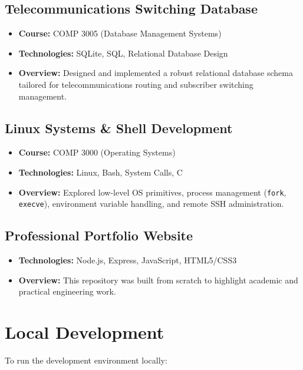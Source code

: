 \documentclass{article}
\begin{document}
\subsection{Telecommunications Switching Database}
\begin{itemize}
    \item \textbf{Course:} COMP 3005 (Database Management Systems)
    \item \textbf{Technologies:} SQLite, SQL, Relational Database Design
    \item \textbf{Overview:} Designed and implemented a robust relational database schema tailored for telecommunications routing and subscriber switching management.
\end{itemize}

\subsection{Linux Systems \& Shell Development}
\begin{itemize}
    \item \textbf{Course:} COMP 3000 (Operating Systems)
    \item \textbf{Technologies:} Linux, Bash, System Calls, C
    \item \textbf{Overview:} Explored low-level OS primitives, process management (\texttt{fork}, \texttt{execve}), environment variable handling, and remote SSH administration.
\end{itemize}

\subsection{Professional Portfolio Website}
\begin{itemize}
    \item \textbf{Technologies:} Node.js, Express, JavaScript, HTML5/CSS3
    \item \textbf{Overview:} This repository was built from scratch to highlight academic and practical engineering work.
\end{itemize}

\section{Local Development}

To run the development environment locally:
\end{document}
